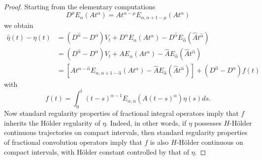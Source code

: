 \documentclass[10pt,a4paper]{amsart}
\begin{document}
\begin{proof}
Starting from the elementary computations
$$
D^\mu E_{\alpha}(A t^\alpha) = At^{\alpha-\mu}E_{\alpha,\alpha+1-\mu}(A t^\alpha)
$$
we obtain
\begin{align}\label{etaapprox}
    \hat{\eta}(t) - \eta(t) &= (D^{\hat\alpha} - D^\alpha)V_t + D^{\alpha}E_\alpha(At^\alpha) - D^{\hat\alpha}E_{\hat\alpha}(\hat{A}t^{\hat\alpha}) \nonumber \\
    &= (D^{\hat\alpha} - D^\alpha)V_t + AE_\alpha(At^\alpha) - \hat{A}E_{\hat\alpha}(\hat{A}t^{\hat\alpha})\nonumber \\
    &=[At^{\alpha-\hat\alpha}E_{\alpha,\alpha+1-\hat\alpha}(A t^\alpha) - \hat{A}E_{\hat\alpha}(\hat{A}t^{\hat\alpha})]+ (D^{\hat\alpha} - D^\alpha)f(t)
\end{align}
with 
\begin{equation*}
f(t) = \int_0^t (t-s)^{\alpha-1}E_{\alpha,\alpha}(A(t-s)^\alpha)\eta(s)ds.
\end{equation*}
Now standard regularity properties of
fractional integral operators imply that $f$ inherits the H\"older regularity of $\eta$. Indeed, in other words,  if $\eta$ possesses $H$-H\"older continuous trajectories on compact intervals, then standard regularity properties of fractional convolution operators imply that $f$ is also $H$-H\"older continuous on compact intervals, with H\"older constant controlled by that of $\eta$.


\end{proof}
\end{document}

